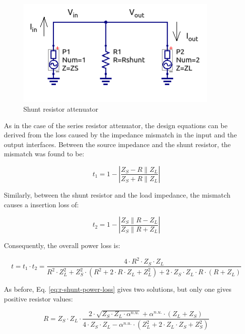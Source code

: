   \begin{figure}[ht]
    \centering
    \includegraphics[width=10cm]{./images/r-shunt-attenuator-schematic.png}
    \caption{Shunt resistor attenuator}
    \label{fig:r-shunt-attenuator-schematic}
  \end{figure}

\noindent As in the case of the series resistor attenuator, the design equations can be derived from the loss caused by the impedance mismatch in the input and the output interfaces. Between the source impedance and the shunt resistor, the mismatch was found to be:

\begin{equation}
	t_1 = 1 - \left| \frac{Z_S - R \parallel Z_L}{Z_S + R \parallel Z_L} \right|
\end{equation}

\noindent Similarly, between the shunt resistor and the load impedance, the mismatch causes a insertion loss of:

\begin{equation}
	t_2 = 1 - \left| \frac{Z_S \parallel R - Z_L}{Z_S \parallel R + Z_L} \right|
\end{equation}

\noindent Consequently, the overall power loss is:

\begin{equation}
	t = t_1 \cdot t_2 = \frac{4 \cdot R^2 \cdot Z_S \cdot Z_L}{R^2 \cdot Z_L^2 + Z_S^2 \cdot (R^2 + 2 \cdot R \cdot Z_L + Z_L^2) + 2 \cdot Z_S \cdot Z_L \cdot R \cdot (R  + Z_L)}
	\label{eq:r-shunt-power-loss}
\end{equation}

\noindent As before, Eq. \ref{eq:r-shunt-power-loss} gives two solutions, but only one gives positive resistor values:

\begin{equation}
	R = Z_S \cdot Z_L \cdot \frac{2 \cdot \sqrt{Z_S \cdot Z_L \cdot \alpha^{n.u.}} + \alpha^{n.u.}  \cdot \left( Z_L + Z_S\right)}{4 \cdot Z_S \cdot Z_L - \alpha^{n.u.} \cdot (Z_L^2 + 2 \cdot Z_L \cdot Z_S + Z_S^2)}
\end{equation}